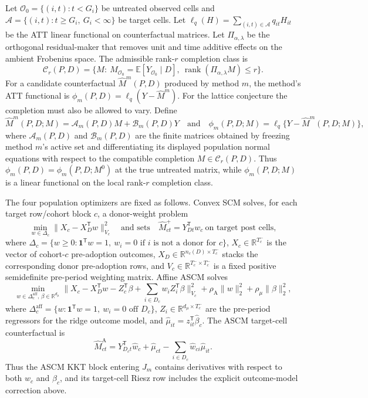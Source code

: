 \documentclass[11pt]{article}
\newcommand{\E}{\mathbb{E}}
\newcommand{\one}{\mathbf{1}}
\newcommand{\transpose}{\mathsf{T}}
\newcommand{\R}{\mathbb{R}}
\theoremstyle{definition}
\theoremstyle{plain}
\theoremstyle{remark}
\begin{document}
Let $\mathcal O_0=\{(i,t):t<G_i\}$ be untreated observed cells and
$\mathcal A=\{(i,t):t\ge G_i,\ G_i<\infty\}$ be target cells. Let
$\ell_q(H)=\sum_{(i,t)\in\mathcal A}q_{it}H_{it}$ be the ATT linear
functional on counterfactual matrices. Let $\Pi_{\alpha,\lambda}$ be the
orthogonal residual-maker that removes unit and time additive effects on the
ambient Frobenius space. The admissible rank-$r$ completion class is
\[
  \mathcal C_r(P,D)=
  \{M:\ M_{\mathcal O_0}=\E[Y_{\mathcal O_0}\mid D],\
        \operatorname{rank}(\Pi_{\alpha,\lambda}M)\le r\}.
\]
For a candidate counterfactual $\widehat M^m(P,D)$ produced by method $m$,
the method's ATT functional is
$\phi_m(P,D)=\ell_q(Y-\widehat M^m)$. For the lattice conjecture the
completion must also be allowed to vary. Define
\[
  \widehat M^m(P,D;M)=\mathcal A_m(P,D)M+\mathcal B_m(P,D)Y
  \quad\text{and}\quad
  \phi_m(P,D;M)=\ell_q\{Y-\widehat M^m(P,D;M)\},
\]
where $\mathcal A_m(P,D)$ and $\mathcal B_m(P,D)$ are the finite matrices
obtained by freezing method $m$'s active set and differentiating its displayed
population normal equations with respect to the compatible completion
$M\in\mathcal C_r(P,D)$. Thus $\phi_m(P,D)=\phi_m(P,D;M^0)$ at the true
untreated matrix, while $\phi_m(P,D;M)$ is a linear functional on the local
rank-$r$ completion class.

The four population optimizers are fixed as follows. Convex SCM solves, for
each target row/cohort block $c$, a donor-weight problem
\[
  \min_{w\in\Delta_c}\|X_c-X_D^\transpose w\|_{V_c}^2
  \quad\text{and sets}\quad \widehat M^{+}_{ct}=Y_{Dt}^\transpose w_c
  \ \text{on target post cells},
\]
where $\Delta_c=\{w\ge0:\one^\transpose w=1,\ w_i=0\text{ if }i\text{ is not a
donor for }c\}$, $X_c\in\R^{T_c^-}$ is the vector of cohort-$c$
pre-adoption outcomes, $X_D\in\R^{n_c(D)\times T_c^-}$ stacks the corresponding
donor pre-adoption rows, and $V_c\in\R^{T_c^-\times T_c^-}$ is a fixed
positive semidefinite pre-period weighting matrix. Affine ASCM solves
\[
  \min_{w\in\Delta_c^{\mathrm{aff}},\,\beta\in\R^{d_\mu}}
  \|X_c-X_D^\transpose w-Z_c^\transpose\beta+
      \sum_{i\in D_c}w_i Z_i^\transpose\beta\|_{V_c}^2
  +\rho_{\mathrm A}\|w\|_2^2+\rho_\mu\|\beta\|_2^2,
\]
where $\Delta_c^{\mathrm{aff}}=\{w:\one^\transpose w=1,\ w_i=0\text{ off }
D_c\}$, $Z_i\in\R^{d_\mu\times T_c^-}$ are the pre-period regressors for the
ridge outcome model, and
$\widehat\mu_{it}=z_{it}^\transpose\widehat\beta_c$. The ASCM target-cell
counterfactual is
\[
  \widehat M^{\mathrm A}_{ct}
  =Y_{D_ct}^\transpose \widehat w_c+
    \widehat\mu_{ct}-\sum_{i\in D_c}\widehat w_{ci}\widehat\mu_{it}.
\]
Thus the ASCM KKT block entering $J_m$ contains derivatives with respect to
both $w_c$ and $\beta_c$, and its target-cell Riesz row includes the explicit
outcome-model correction above.
\end{document}
